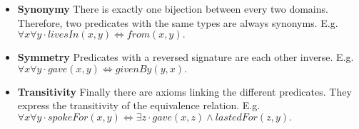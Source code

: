 \begin{itemize}
  \item \textbf{Synonymy} There is exactly one bijection between every two domains. Therefore, two predicates with the same types are always synonyms. E.g. $\forall x \forall y \cdot livesIn(x, y) \Leftrightarrow from(x, y).$
  \item \textbf{Symmetry} Predicates with a reversed signature are each other inverse. E.g. $\forall x \forall y \cdot gave(x, y) \Leftrightarrow givenBy(y, x).$
  \item \textbf{Transitivity} Finally there are axioms linking the different predicates. They express the transitivity of the equivalence relation. E.g. $\forall x \forall y \cdot spokeFor(x, y) \Leftrightarrow \exists z \cdot gave(x, z) \land lastedFor(z, y).$
\end{itemize}
